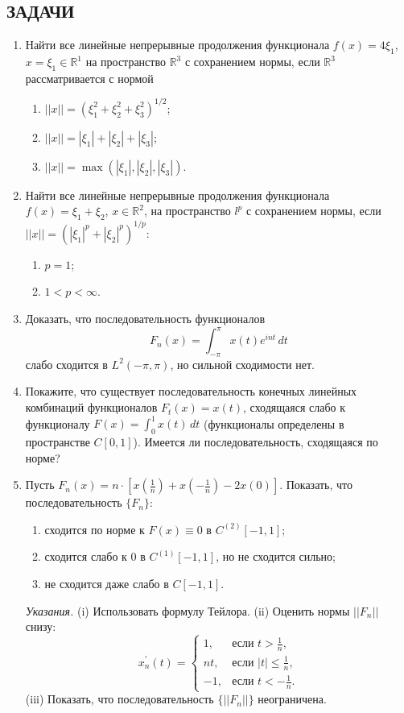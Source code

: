 \documentclass[12pt,a4paper]{article}
\begin{document}
\subsection*{ЗАДАЧИ}
\begin{enumerate}
\item Найти все линейные непрерывные продолжения функционала $f(x) = 4\xi_{1}$, $x = \xi_{1} \in \mathbb{R}^{1}$ на пространство $\mathbb{R}^{3}$ с сохранением нормы, если $\mathbb{R}^{3}$ рассматривается с нормой
\begin{enumerate}[label=\alph*)]
\item $||x|| = (\xi_{1}^{2} + \xi_{2}^{2} + \xi_{3}^{2})^{1/2}$;
\item $||x|| = |\xi_{1}| + |\xi_{2}| + |\xi_{3}|$;
\item $||x|| = \max(|\xi_{1}|, |\xi_{2}|, |\xi_{3}|)$.
\end{enumerate}

\item Найти все линейные непрерывные продолжения функционала $f(x) = \xi_{1} + \xi_{2}$, $x \in \mathbb{R}^{2}$, на пространство $l^{p}$ с сохранением нормы, если $||x|| = (|\xi_{1}|^{p} + |\xi_{2}|^{p})^{1/p}$:
\begin{enumerate}[label=\alph*)]
\item $p=1$;
\item $1 < p < \infty$.
\end{enumerate}

\item Доказать, что последовательность функционалов
$$F_{n}(x) = \int_{-\pi}^{\pi} x(t) e^{int} \, dt$$
слабо сходится в $L^{2}(-\pi,\pi)$, но сильной сходимости нет.

\item Покажите, что существует последовательность конечных линейных комбинаций функционалов $F_{t}(x) = x(t)$, сходящаяся слабо к функционалу $F(x) = \int_{0}^{1} x(t) \, dt$ (функционалы определены в пространстве $C[0,1]$). Имеется ли последовательность, сходящаяся по норме?

\item Пусть $F_{n}(x) = n \cdot \left[x(\frac{1}{n}) + x(-\frac{1}{n}) - 2x(0)\right]$. Показать, что последовательность $\{F_{n}\}$:
\begin{enumerate}[label=\alph*)]
\item сходится по норме к $F(x) \equiv 0$ в $C^{(2)}[-1,1]$;
\item сходится слабо к $0$ в $C^{(1)}[-1,1]$, но не сходится сильно;
\item не сходится даже слабо в $C[-1,1]$.
\end{enumerate}
\textit{Указания.} (i) Использовать формулу Тейлора. (ii) Оценить нормы $||F_{n}||$ снизу:
$$x_{n}^{\prime}(t) =
\begin{cases} 1, & \text{если } t > \frac{1}{n}, \\ nt, & \text{если } |t| \le \frac{1}{n}, \\ -1, & \text{если } t < -\frac{1}{n}.
\end{cases}$$
(iii) Показать, что последовательность $\{||F_{n}||\}$ неограничена.


\end{enumerate}
\end{document}
